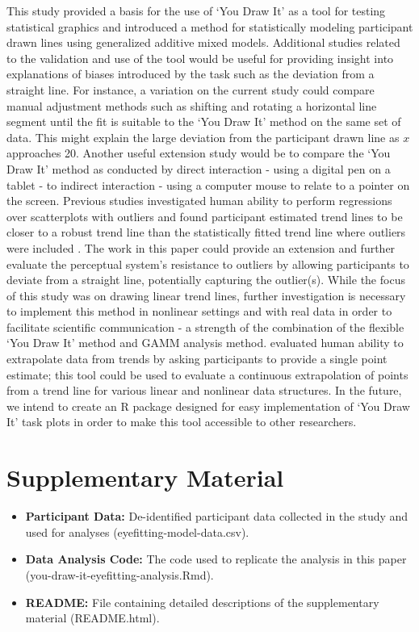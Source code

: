 \documentclass[12pt]{article}
\providecommand{\tightlist}{%
  \setlength{\itemsep}{0pt}\setlength{\parskip}{0pt}}
\begin{document}
This study provided a basis for the use of `You Draw It' as a tool for
testing statistical graphics and introduced a method for statistically
modeling participant drawn lines using generalized additive mixed
models. Additional studies related to the validation and use of the tool
would be useful for providing insight into explanations of biases
introduced by the task such as the deviation from a straight line. For
instance, a variation on the current study could compare manual
adjustment methods such as shifting and rotating a horizontal line
segment until the fit is suitable to the `You Draw It' method on the
same set of data. This might explain the large deviation from the
participant drawn line as \(x\) approaches 20. Another useful extension
study would be to compare the `You Draw It' method as conducted by
direct interaction - using a digital pen on a tablet - to indirect
interaction - using a computer mouse to relate to a pointer on the
screen. Previous studies investigated human ability to perform
regressions over scatterplots with outliers and found participant
estimated trend lines to be closer to a robust trend line than the
statistically fitted trend line where outliers were included
\citep{bobko_1979, correll_2017}. The work in this paper could provide
an extension and further evaluate the perceptual system's resistance to
outliers by allowing participants to deviate from a straight line,
potentially capturing the outlier(s). While the focus of this study was
on drawing linear trend lines, further investigation is necessary to
implement this method in nonlinear settings and with real data in order
to facilitate scientific communication - a strength of the combination
of the flexible `You Draw It' method and GAMM analysis method.
\citet{ciccione2021can} evaluated human ability to extrapolate data from
trends by asking participants to provide a single point estimate; this
tool could be used to evaluate a continuous extrapolation of points from
a trend line for various linear and nonlinear data structures. In the
future, we intend to create an R package designed for easy
implementation of `You Draw It' task plots in order to make this tool
accessible to other researchers.

\hypertarget{supplementary-material}{%
\section{Supplementary Material}\label{supplementary-material}}

\begin{itemize}
\tightlist
\item
  \textbf{Participant Data:} De-identified participant data collected in
  the study and used for analyses (eyefitting-model-data.csv).
\item
  \textbf{Data Analysis Code:} The code used to replicate the analysis
  in this paper (you-draw-it-eyefitting-analysis.Rmd).
\item
  \textbf{README:} File containing detailed descriptions of the
  supplementary material (README.html).
\end{itemize}



\end{document}
